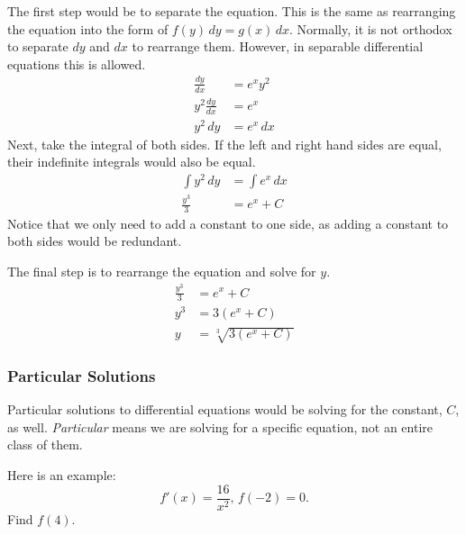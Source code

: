 \documentclass[12pt]{article}
\begin{document}
The first step would be to separate the equation. This is the same as rearranging the equation into the form of $f(y) \, dy = g(x) \, dx$. Normally, it is not orthodox to separate $dy$ and $dx$ to rearrange them. However, in separable differential equations this is allowed.
\begin{align*}
	\frac{dy}{dx}     & = e^x y^2   \\[6pt]
	y^2 \frac{dy}{dx} & = e^x       \\[6pt]
	y^2 \, dy         & = e^x \, dx
\end{align*}
Next, take the integral of both sides. If the left and right hand sides are equal, their indefinite integrals would also be equal.
\begin{align*}
	\int y^2 \, dy & = \int e^x \, dx \\
	\frac{y^3}{3}  & = e^x + C
\end{align*}
Notice that we only need to add a constant to one side, as adding a constant to both sides would be redundant.

\noindent The final step is to rearrange the equation and solve for $y$.
\begin{align*}
	\frac{y^3}{3} & = e^x + C                            \\[6pt]
	y^3           & = 3 \left( e^x + C \right)           \\
	y             & = \sqrt[3]{3 \left( e^x + C \right)}
\end{align*}

\subsubsection{Particular Solutions}
Particular solutions to differential equations would be solving for the constant, $C$, as well. \textit{Particular} means we are solving for a specific equation, not an entire class of them.

\noindent Here is an example:
\[ f'(x) = \frac{16}{x^2}, \, f(-2) = 0. \]
Find $f(4)$.
\end{document}
